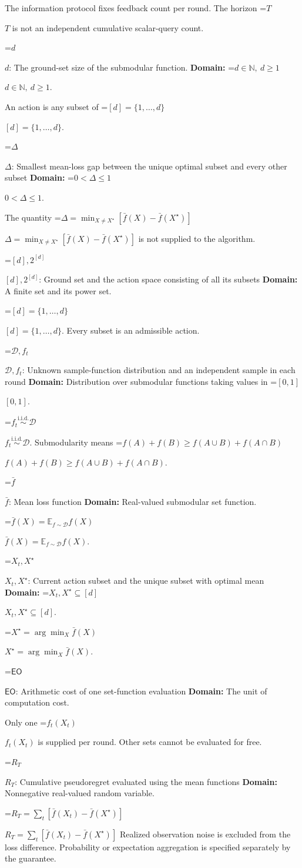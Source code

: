 \documentclass[10pt,a4paper]{article}
\newcommand{\AtlasMath}[1]{\par\begingroup\centering\setbox0=\hbox{$\displaystyle #1$}\ifdim\wd0>1.4\linewidth\typeout{ATLAS WIDE FORMULA: \the\wd0}\fi\ifdim\wd0>\linewidth\resizebox{\linewidth}{!}{\box0}\else\box0\fi\par\endgroup}
\newcommand{\AtlasInlineMath}[1]{\begingroup\setbox0=\hbox{$#1$}\ifdim\wd0>.4\linewidth\endgroup\AtlasMath{#1}\else\endgroup$#1$\fi}
\begin{document}
The information protocol fixes feedback count per round. The horizon \AtlasInlineMath{T} is not an independent cumulative scalar-query count.

\AtlasInlineMath{d}: The ground-set size of the submodular function. \textbf{Domain:} \AtlasInlineMath{d\in\mathbb N,\ d\ge1}.

An action is any subset of \AtlasInlineMath{[d]=\{1,\ldots,d\}}.

\AtlasInlineMath{\Delta}: Smallest mean-loss gap between the unique optimal subset and every other subset \textbf{Domain:} \AtlasInlineMath{0<\Delta\le1}.

The quantity \AtlasInlineMath{\Delta=\min_{X\ne X^\star}[\bar f(X)-\bar f(X^\star)]} is not supplied to the algorithm.

\AtlasInlineMath{[d],2^{[d]}}: Ground set and the action space consisting of all its subsets \textbf{Domain:} A finite set and its power set.

\AtlasInlineMath{[d]=\{1,\ldots,d\}}. Every subset is an admissible action.

\AtlasInlineMath{\mathcal D,f_t}: Unknown sample-function distribution and an independent sample in each round \textbf{Domain:} Distribution over submodular functions taking values in \AtlasInlineMath{[0,1]}.

\AtlasInlineMath{f_t\overset{\mathrm{i.i.d.}}\sim\mathcal D}. Submodularity means \AtlasInlineMath{f(A)+f(B)\ge f(A\cup B)+f(A\cap B)}.

\AtlasInlineMath{\bar f}: Mean loss function \textbf{Domain:} Real-valued submodular set function.

\AtlasInlineMath{\bar f(X)=\mathbb E_{f\sim\mathcal D}f(X)}.

\AtlasInlineMath{X_t,X^\star}: Current action subset and the unique subset with optimal mean \textbf{Domain:} \AtlasInlineMath{X_t,X^\star\subseteq[d]}.

\AtlasInlineMath{X^\star=\arg\min_X\bar f(X)}.

\AtlasInlineMath{\mathsf{EO}}: Arithmetic cost of one set-function evaluation \textbf{Domain:} The unit of computation cost.

Only one \AtlasInlineMath{f_t(X_t)} is supplied per round. Other sets cannot be evaluated for free.

\AtlasInlineMath{R_T}: Cumulative pseudoregret evaluated using the mean functions \textbf{Domain:} Nonnegative real-valued random variable.

\AtlasInlineMath{R_T=\sum_t[\bar f(X_t)-\bar f(X^\star)]} Realized observation noise is excluded from the loss difference. Probability or expectation aggregation is specified separately by the guarantee.
\end{document}

